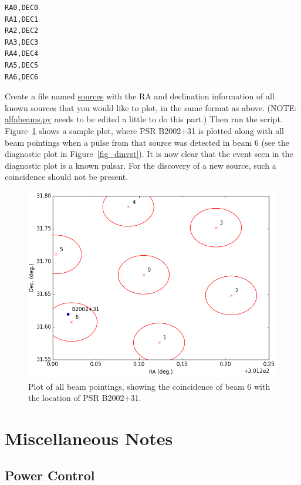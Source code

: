 \documentclass{article}
\begin{document}
\small{
\begin{verbatim}
RA0,DEC0
RA1,DEC1
RA2,DEC2
RA3,DEC3
RA4,DEC4
RA5,DEC5
RA6,DEC6
\end{verbatim}
}

Create a file named \url{sources} with the RA and declination information of
all known sources that you would like to plot, in the same format as above.
(NOTE: \url{alfabeams.py} needs to be edited a little to do this part.) Then
run the script. Figure~\ref{fig_pointings} shows a sample plot, where PSR
B2002+31 is plotted along with all beam pointings when a pulse from that source
was detected in beam 6 (see the diagnostic plot in Figure~\ref{fig_dmvst}). It
is now clear that the event seen in the diagnostic plot is a known pulsar. For
the discovery of a new source, such a coincidence should not be present.

\begin{figure}[h]
\includegraphics[width=\textwidth]{pointings.png}
\caption{Plot of all beam pointings, showing the coincidence of beam 6 with the
location of PSR B2002+31.\label{fig_pointings}}
\end{figure}


\section{Miscellaneous Notes}

\subsection{Power Control}
\end{document}
